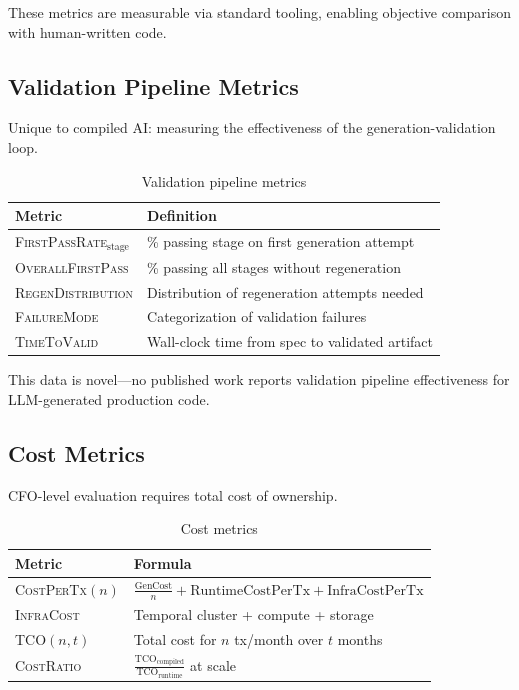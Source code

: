 \documentclass[11pt]{article}
\newcommand{\metric}[1]{\textsc{#1}}
\begin{document}
These metrics are measurable via standard tooling, enabling objective comparison with human-written code.

\subsection{Validation Pipeline Metrics}

Unique to compiled AI: measuring the effectiveness of the generation-validation loop.

\begin{table}[ht]
\centering
\caption{Validation pipeline metrics}
\label{tab:validation-metrics}
\begin{tabular}{p{4cm}p{8cm}}
\toprule
Metric & Definition \\
\midrule
\metric{FirstPassRate}$_{\text{stage}}$ & \% passing stage on first generation attempt \\
\metric{OverallFirstPass} & \% passing all stages without regeneration \\
\metric{RegenDistribution} & Distribution of regeneration attempts needed \\
\metric{FailureMode} & Categorization of validation failures \\
\metric{TimeToValid} & Wall-clock time from spec to validated artifact \\
\bottomrule
\end{tabular}
\end{table}

This data is novel—no published work reports validation pipeline effectiveness for LLM-generated production code.

\subsection{Cost Metrics}

CFO-level evaluation requires total cost of ownership.

\begin{table}[ht]
\centering
\caption{Cost metrics}
\label{tab:cost-metrics}
\begin{tabular}{p{3.5cm}p{8.5cm}}
\toprule
Metric & Formula \\
\midrule
\metric{CostPerTx}$(n)$ & $\frac{\text{GenCost}}{n} + \text{RuntimeCostPerTx} + \text{InfraCostPerTx}$ \\
\metric{InfraCost} & Temporal cluster + compute + storage \\
\metric{TCO}$(n, t)$ & Total cost for $n$ tx/month over $t$ months \\
\metric{CostRatio} & $\frac{\text{TCO}_{\text{compiled}}}{\text{TCO}_{\text{runtime}}}$ at scale \\
\bottomrule
\end{tabular}
\end{table}
\end{document}
